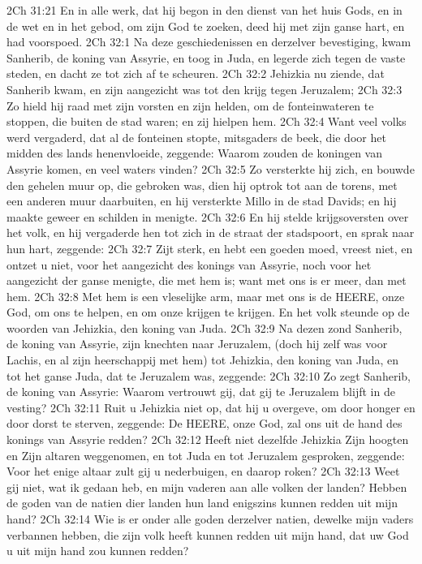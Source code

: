 2Ch 31:21  En in alle werk, dat hij begon in den dienst van het huis Gods, en in de wet en in het gebod, om zijn God te zoeken, deed hij met zijn ganse hart, en had voorspoed.
2Ch 32:1  Na deze geschiedenissen en derzelver bevestiging, kwam Sanherib, de koning van Assyrie, en toog in Juda, en legerde zich tegen de vaste steden, en dacht ze tot zich af te scheuren.
2Ch 32:2  Jehizkia nu ziende, dat Sanherib kwam, en zijn aangezicht was tot den krijg tegen Jeruzalem;
2Ch 32:3  Zo hield hij raad met zijn vorsten en zijn helden, om de fonteinwateren te stoppen, die buiten de stad waren; en zij hielpen hem.
2Ch 32:4  Want veel volks werd vergaderd, dat al de fonteinen stopte, mitsgaders de beek, die door het midden des lands henenvloeide, zeggende: Waarom zouden de koningen van Assyrie komen, en veel waters vinden?
2Ch 32:5  Zo versterkte hij zich, en bouwde den gehelen muur op, die gebroken was, dien hij optrok tot aan de torens, met een anderen muur daarbuiten, en hij versterkte Millo in de stad Davids; en hij maakte geweer en schilden in menigte.
2Ch 32:6  En hij stelde krijgsoversten over het volk, en hij vergaderde hen tot zich in de straat der stadspoort, en sprak naar hun hart, zeggende:
2Ch 32:7  Zijt sterk, en hebt een goeden moed, vreest niet, en ontzet u niet, voor het aangezicht des konings van Assyrie, noch voor het aangezicht der ganse menigte, die met hem is; want met ons is er meer, dan met hem.
2Ch 32:8  Met hem is een vleselijke arm, maar met ons is de HEERE, onze God, om ons te helpen, en om onze krijgen te krijgen. En het volk steunde op de woorden van Jehizkia, den koning van Juda.
2Ch 32:9  Na dezen zond Sanherib, de koning van Assyrie, zijn knechten naar Jeruzalem, (doch hij zelf was voor Lachis, en al zijn heerschappij met hem) tot Jehizkia, den koning van Juda, en tot het ganse Juda, dat te Jeruzalem was, zeggende:
2Ch 32:10  Zo zegt Sanherib, de koning van Assyrie: Waarom vertrouwt gij, dat gij te Jeruzalem blijft in de vesting?
2Ch 32:11  Ruit u Jehizkia niet op, dat hij u overgeve, om door honger en door dorst te sterven, zeggende: De HEERE, onze God, zal ons uit de hand des konings van Assyrie redden?
2Ch 32:12  Heeft niet dezelfde Jehizkia Zijn hoogten en Zijn altaren weggenomen, en tot Juda en tot Jeruzalem gesproken, zeggende: Voor het enige altaar zult gij u nederbuigen, en daarop roken?
2Ch 32:13  Weet gij niet, wat ik gedaan heb, en mijn vaderen aan alle volken der landen? Hebben de goden van de natien dier landen hun land enigszins kunnen redden uit mijn hand?
2Ch 32:14  Wie is er onder alle goden derzelver natien, dewelke mijn vaders verbannen hebben, die zijn volk heeft kunnen redden uit mijn hand, dat uw God u uit mijn hand zou kunnen redden?
